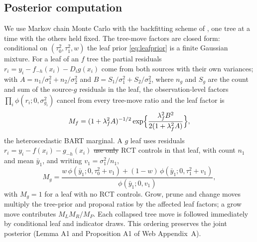 \documentclass[11pt]{article}
\theoremstyle{definition}
\theoremstyle{plain}
\providecommand{\DIFaddtex}[1]{{\protect\color{blue}\uwave{#1}}} %
\providecommand{\DIFdeltex}[1]{{\protect\color{red}\sout{#1}}}                      %
\providecommand{\DIFaddbegin}{} %
\providecommand{\DIFaddend}{} %
\providecommand{\DIFdelbegin}{} %
\providecommand{\DIFdelend}{} %
\providecommand{\DIFadd}[1]{\texorpdfstring{\DIFaddtex{#1}}{#1}} %
\providecommand{\DIFdel}[1]{\texorpdfstring{\DIFdeltex{#1}}{}} %
\newcommand{\DIFscaledelfig}{0.5}
\newlength{\DIFdelgraphicswidth} %
\newlength{\DIFdelgraphicsheight} %
\newcommand{\DIFaddincludegraphics}[2][]{{\color{blue}\fbox{\DIFOincludegraphics[#1]{#2}}}} %
\newcommand{\DIFdelincludegraphics}[2][]{%
\sbox{\DIFdelgraphicsbox}{\DIFOincludegraphics[#1]{#2}}%
\settoboxwidth{\DIFdelgraphicswidth}{\DIFdelgraphicsbox} %
\settoboxtotalheight{\DIFdelgraphicsheight}{\DIFdelgraphicsbox} %
\scalebox{\DIFscaledelfig}{%
\parbox[b]{\DIFdelgraphicswidth}{\usebox{\DIFdelgraphicsbox}\\[-\baselineskip] \rule{\DIFdelgraphicswidth}{0em}}\llap{\resizebox{\DIFdelgraphicswidth}{\DIFdelgraphicsheight}{%
\setlength{\unitlength}{\DIFdelgraphicswidth}%
\begin{picture}(1,1)%
\thicklines\linethickness{2pt} %
{\color[rgb]{1,0,0}\put(0,0){\framebox(1,1){}}}%
{\color[rgb]{1,0,0}\put(0,0){\line( 1,1){1}}}%
{\color[rgb]{1,0,0}\put(0,1){\line(1,-1){1}}}%
\end{picture}%
}\hspace*{3pt}}} %
} %
\DeclareRobustCommand{\DIFaddbegin}{\DIFOaddbegin \let\includegraphics\DIFaddincludegraphics} %
\DeclareRobustCommand{\DIFaddend}{\DIFOaddend \let\includegraphics\DIFOincludegraphics} %
\DeclareRobustCommand{\DIFdelbegin}{\DIFOdelbegin \let\includegraphics\DIFdelincludegraphics} %
\DeclareRobustCommand{\DIFdelend}{\DIFOaddend \let\includegraphics\DIFOincludegraphics} %
\begin{document}
\subsection{Posterior computation}
\label{sec:posterior}

We use Markov chain Monte Carlo with the backfitting scheme of \citet{Chipman2010BART}, one tree at a time with the others held fixed. The tree-move factors are closed form: conditional on $(\tau_0^2,\tau_1^2,w)$ the leaf prior \eqref{eq:leafprior} is a finite Gaussian mixture. For a leaf of an $f$ tree the partial residuals $r_i=y_i-f_{-h}(x_i)-D_ig(x_i)$ come from both sources with their own variances; with $A=n_1/\sigma_1^2+n_2/\sigma_2^2$ and $B=S_1/\sigma_1^2+S_2/\sigma_2^2$, where $n_g$ and $S_g$ are the count and sum of the source-$g$ residuals in the leaf, the observation-level factors $\prod_i\phi(r_i;0,\sigma^2_{g_i})$ cancel from every tree-move ratio and the leaf factor is
\begin{equation}
M_f=(1+\lambda_f^2A)^{-1/2}\exp\Bigl\{\frac{\lambda_f^2B^2}{2(1+\lambda_f^2A)}\Bigr\},
\label{eq:Mf}
\end{equation}
the heteroscedastic BART marginal. A $g$ leaf uses residuals $r_i=y_i-f(x_i)-g_{-h}(x_i)$ \DIFdelbegin \DIFdel{use only }\DIFdelend \DIFaddbegin \DIFadd{from }\DIFaddend RCT controls in that leaf, with count $n_1$ and mean $\bar y_1$, and writing $v_1=\sigma_1^2/n_1$,
\begin{equation}
M_g=\frac{w\,\phi(\bar y_1;0,\tau_0^2+v_1)+(1-w)\,\phi(\bar y_1;0,\tau_1^2+v_1)}{\phi(\bar y_1;0,v_1)},
\label{eq:Mg}
\end{equation}
with $M_g=1$ for a leaf with no RCT controls. Grow, prune and change moves multiply the tree-prior and proposal ratios by the affected leaf factors; a grow move contributes $M_LM_R/M_P$. Each collapsed tree move is followed immediately by conditional leaf and indicator draws. This ordering preserves the joint posterior (Lemma A1 and Proposition A1 of Web Appendix~A).
\end{document}
